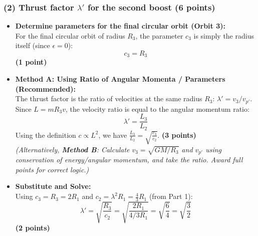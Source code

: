 \documentclass[11pt, a4paper]{article} %
\begin{document}
\subsubsection*{(2) Thrust factor $\lambda'$ for the second boost (6 points)}
\begin{itemize}
    \item \textbf{Determine parameters for the final circular orbit (Orbit 3):} \\
    For the final circular orbit of radius $R_3$, the parameter $c_3$ is simply the radius itself (since $\epsilon=0$):
    \[
    c_3 = R_3
    \]
    \hfill \textbf{(1 point)}

    \item \textbf{Method A: Using Ratio of Angular Momenta / Parameters (Recommended):} \\
    The thrust factor is the ratio of velocities at the same radius $R_3$: $\lambda' = v_3 / v_{p'}$.
    Since $L = m R_3 v$, the velocity ratio is equal to the angular momentum ratio:
    \[
    \lambda' = \frac{L_3}{L_2}
    \]
    Using the definition $c \propto L^2$, we have $\frac{L_3}{L_2} = \sqrt{\frac{c_3}{c_2}}$.
    \hfill \textbf{(3 points)} \\
    \textit{(Alternatively, \textbf{Method B}: Calculate $v_3 = \sqrt{GM/R_3}$ and $v_{p'}$ using conservation of energy/angular momentum, and take the ratio. Award full points for correct logic.)}

    \item \textbf{Substitute and Solve:} \\
    Using $c_3 = R_3 = 2R_1$ and $c_2 = \lambda^2 R_1 = \frac{4}{3}R_1$ (from Part 1):
    \[
    \lambda' = \sqrt{\frac{R_3}{c_2}} = \sqrt{\frac{2R_1}{4/3 R_1}} = \sqrt{\frac{6}{4}} = \sqrt{\frac{3}{2}}
    \]
    \hfill \textbf{(2 points)} \\
\end{itemize}

\newpage
\end{document}
